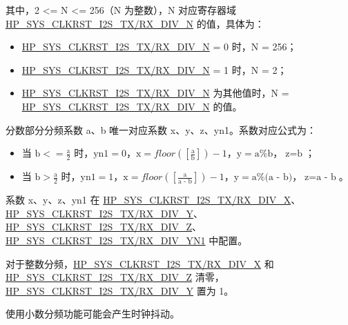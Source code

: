 \documentclass[main\_\_CN.tex]{subfiles}
\begin{document}
其中，2 <= N <= 256（N 为整数），N 对应寄存器域 \hyperref[fielddesc:HPSYSCLKRSTI2S0TXDIVN]{HP\_SYS\_CLKRST\_I2S\_TX/RX\_DIV\_N} 的值，具体为：
\begin{itemize}
    \item \hyperref[fielddesc:HPSYSCLKRSTI2S0TXDIVN]{HP\_SYS\_CLKRST\_I2S\_TX/RX\_DIV\_N} = 0 时，N = 256；
    \item \hyperref[fielddesc:HPSYSCLKRSTI2S0TXDIVN]{HP\_SYS\_CLKRST\_I2S\_TX/RX\_DIV\_N} = 1 时，N = 2；
    \item \hyperref[fielddesc:HPSYSCLKRSTI2S0TXDIVN]{HP\_SYS\_CLKRST\_I2S\_TX/RX\_DIV\_N} 为其他值时，N = \hyperref[fielddesc:HPSYSCLKRSTI2S0TXDIVN]{HP\_SYS\_CLKRST\_I2S\_TX/RX\_DIV\_N} 的值。
\end{itemize}

分数部分分频系数 a、b 唯一对应系数 x、y、z、yn1。系数对应公式为：

\begin{itemize}
    \item 当 $\textrm{b} <= \frac{\textrm{a}}{2}$ 时，$\textrm{yn1} = 0$，$\textrm{x} = floor([\frac{\textrm{a}}{\textrm{b}}]) - 1$，$\textrm{y} = \textrm{a}\%\textrm{b}$，$\textrm{z} = \textrm{b}$；
    \item 当 $\textrm{b} > \frac{\textrm{a}}{2}$ 时，$\textrm{yn1}=1$，$\textrm{x} = floor([\frac{\textrm{a}}{\textrm{a - b}}]) - 1$，$\textrm{y} = \textrm{a}\%\textrm{(a - b)}$，$\textrm{z}=\textrm{a - b}$。
\end{itemize}

系数 x、y、z、yn1 在 \hyperref[fielddesc:HPSYSCLKRSTI2S0TXDIVX]{HP\_SYS\_CLKRST\_I2S\_TX/RX\_DIV\_X}、\hyperref[fielddesc:HPSYSCLKRSTI2S0TXDIVY]{HP\_SYS\_CLKRST\_I2S\_TX/RX\_DIV\_Y}、\hyperref[fielddesc:HPSYSCLKRSTI2S0TXDIVZ]{HP\_SYS\_CLKRST\_I2S\_TX/RX\_DIV\_Z}、\hyperref[fielddesc:HPSYSCLKRSTI2S0TXDIVYN1]{HP\_SYS\_CLKRST\_I2S\_TX/RX\_DIV\_YN1} 中配置。 

对于整数分频，\hyperref[fielddesc:HPSYSCLKRSTI2S0TXDIVX]{HP\_SYS\_CLKRST\_I2S\_TX/RX\_DIV\_X} 和 \hyperref[fielddesc:HPSYSCLKRSTI2S0TXDIVZ]{HP\_SYS\_CLKRST\_I2S\_TX/RX\_DIV\_Z} 清零，\hyperref[fielddesc:HPSYSCLKRSTI2S0TXDIVY]{HP\_SYS\_CLKRST\_I2S\_TX/RX\_DIV\_Y} 置为 1。

\begin{tiplisting}
使用小数分频功能可能会产生时钟抖动。
\end{tiplisting}
\end{document}
